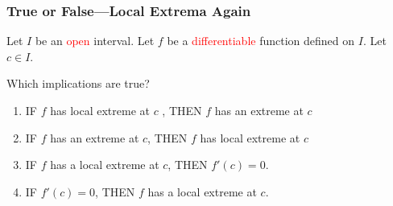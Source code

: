 \documentclass[14pt]{beamer}
\begin{document}
	\begin{frame}[t]
		\frametitle{True or False---Local Extrema Again}

		Let $I$ be an \textcolor{red}{open} interval. Let $f$ be a \textcolor{red}{differentiable}
		function defined on $I$. Let $c\in I$.

		Which implications are true?
		\begin{enumerate}
			\item IF $f$ has local extreme at $c$ , THEN $f$ has an extreme at $c$
			\item IF $f$ has an extreme at $c$, THEN $f$ has local extreme at $c$
			\item IF $f$ has a local extreme at $c$, THEN $f' (c ) = 0$.
			\item IF $f'(c ) = 0$, THEN $f$ has a local extreme at $c$.
		\end{enumerate}

	\end{frame}
\end{document}
